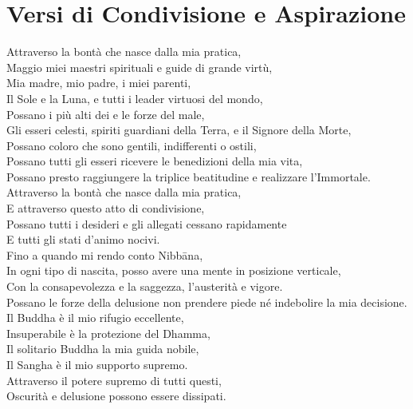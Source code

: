 \chapter{Versi di Condivisione e Aspirazione}

\begin{leader}
\end{leader}

\enlargethispage{2\baselineskip}

Attraverso la bontà che nasce dalla mia pratica,\\
Maggio miei maestri spirituali e guide di grande virtù,\\
Mia madre, mio padre, i miei parenti,\\
Il Sole e la Luna, e tutti i leader virtuosi del mondo,\\
Possano i più alti dei e le forze del male,\\
Gli esseri celesti, spiriti guardiani della Terra, e il Signore della Morte,\\
Possano coloro che sono gentili, indifferenti o ostili,\\
Possano tutti gli esseri ricevere le benedizioni della mia vita,\\
Possano presto raggiungere la triplice beatitudine e realizzare l'Immortale.\\
Attraverso la bontà che nasce dalla mia pratica,\\
E attraverso questo atto di condivisione,\\
Possano tutti i desideri e gli allegati cessano rapidamente\\
E tutti gli stati d'animo nocivi.\\
Fino a quando mi rendo conto Nibbāna,\\
In ogni tipo di nascita, posso avere una mente in posizione verticale,\\
Con la consapevolezza e la saggezza, l'austerità e vigore.\\
Possano le forze della delusione non prendere piede né indebolire la mia decisione.\\
Il Buddha è il mio rifugio eccellente,\\
Insuperabile è la protezione del Dhamma,\\
Il solitario Buddha la mia guida nobile,\\
Il Sangha è il mio supporto supremo.\\
Attraverso il potere supremo di tutti questi,\\
Oscurità e delusione possono essere dissipati.
